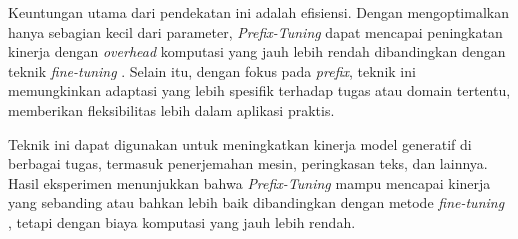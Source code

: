 Keuntungan utama dari pendekatan ini adalah efisiensi. Dengan mengoptimalkan hanya sebagian kecil dari parameter, \textit{Prefix-Tuning} dapat mencapai peningkatan kinerja dengan \textit{overhead} komputasi yang jauh lebih rendah dibandingkan dengan teknik \textit{fine-tuning} . Selain itu, dengan fokus pada \textit{prefix}, teknik ini memungkinkan adaptasi yang lebih spesifik terhadap tugas atau domain tertentu, memberikan fleksibilitas lebih dalam aplikasi praktis.

Teknik ini dapat digunakan untuk meningkatkan kinerja model generatif di berbagai tugas, termasuk penerjemahan mesin, peringkasan teks, dan lainnya. Hasil eksperimen menunjukkan bahwa \textit{Prefix-Tuning} mampu mencapai kinerja yang sebanding atau bahkan lebih baik dibandingkan dengan metode \textit{fine-tuning} , tetapi dengan biaya komputasi yang jauh lebih rendah.

